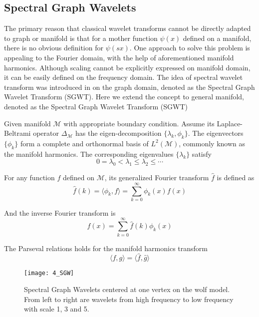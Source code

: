 \subsection{Spectral Graph Wavelets}

The primary reason that classical wavelet transforms cannot be directly adapted to graph or manifold is
that for a mother function $\psi(x)$ defined on a manifold,
there is no obvious definition for $\psi(sx)$. One approach to solve this problem is appealing to the Fourier domain,
with the help of aforementioned manifold harmonics. Although scaling cannot be explicitly expressed on manifold domain,
it can be easily defined on the frequency domain. The idea of spectral wavelet transform was introduced in \cite{Hammond2011}
on the graph domain, denoted as the Spectral Graph Wavelet Transform (SGWT). Here we extend the concept to general manifold,
denoted as the Spectral Graph Wavelet Transform (SGWT)

Given manifold $\mathcal{M}$ with appropriate boundary condition. Assume its Laplace-Beltrami operator $\Delta_\mathcal{M}$ has the eigen-decomposition $\{\lambda_k,\phi_k\}$. The eigenvectors $\{\phi_k\}$ form a complete and orthonormal basis of $L^2(\mathcal{M})$, commonly known as the manifold harmonics. The corresponding eigenvalues $\{\lambda_k\}$ satisfy
\begin{equation}
0=\lambda_0 < \lambda_1 \leq \lambda_2 \leq \cdots
\end{equation}

For any function $f$ defined on $\mathcal{M}$, its generalized Fourier transform $\hat{f}$ is defined as
\begin{equation}
\hat{f}(k)=\langle \phi_k, f \rangle=\sum_{k=0}^\infty \phi_k(x)f(x)
\end{equation}

And the inverse Fourier transform is
\begin{equation}
f(x)=\sum_{k=0}^\infty\hat{f}(k)\phi_k(x)
\end{equation}

The Parseval relations holds for the manifold harmonics transform
\begin{equation}
\label{eq:parseval}
\langle f,g\rangle=\langle\hat{f},\hat{g}\rangle
\end{equation}

\begin{figure}[!to]
\begin{center}
\texttt{[image: 4\_SGW]}
\end{center}
\caption[Spectral graph wavelets on the wolf model.]{Spectral Graph Wavelets centered at one vertex on the wolf model.
  From left to right are wavelets from high frequency to low frequency with
  scale 1, 3 and 5.}
\label{SGW}
\end{figure}

